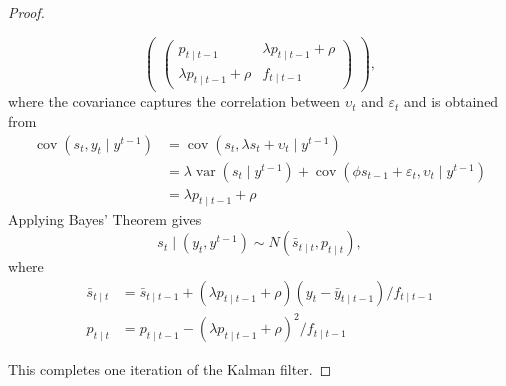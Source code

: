 \documentclass[oneside,reqno]{amsart}
\DeclareMathOperator{\var}{var}
\DeclareMathOperator{\cov}{cov}
\newcommand{\eps}{\varepsilon}
\newcommand{\ups}{\upsilon}
\theoremstyle{definition}
\begin{document}
\begin{enumerate}
\begin{proof}
\begin{enumerate}[label=(\arabic*)]
\[\begin{pmatrix}
		\begin{pmatrix}
			p_{t \mid t-1} & \lambda p_{t \mid t-1} + \rho \\
			\lambda p_{t \mid t-1} + \rho & f_{t \mid t-1}
		\end{pmatrix}
	\end{pmatrix},
\]
where the covariance captures the correlation between $\ups_t$ and $\eps_t$ and is obtained from
\begin{align*}
	\cov(s_t, y_t \mid y^{t-1}) &= \cov(s_t, \lambda s_t + \ups_t \mid y^{t-1}) \\
	&= \lambda \var(s_t\mid y^{t-1}) + \cov(\phi s_{t-1} + \eps_t, \ups_t\mid y^{t-1}) \\
	&= \lambda p_{t \mid t-1} + \rho 
\end{align*}
Applying Bayes' Theorem gives 
\[
	s_t \mid (y_t, y^{t-1}) \sim N(\bar s_{t\mid t}, p_{t\mid t}),
\]
where 
\begin{align*}
	\bar s_{t\mid t} &= \bar s_{t\mid t-1} + (\lambda p_{t \mid t-1} + \rho) (y_t - \bar y_{t\mid t-1})/ f_{t \mid t-1} \\
	p_{t \mid t} &= p_{t \mid t-1} -  (\lambda p_{t \mid t-1} + \rho)^2 / f_{t \mid t-1}
\end{align*}
\end{enumerate}
This completes one iteration of the Kalman filter.
\end{proof}

\end{enumerate}
\end{document}
